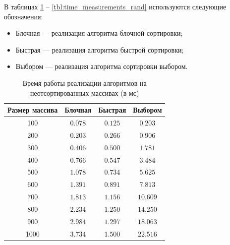 В таблицах \ref{tbl:time_measurements} -- \ref{tbl:time_measurements_rand} используются следующие обозначения: 
\begin{itemize}
	\item Блочная --- реализация алгоритма блочной сортировки;
	\item Быстрая --- реализация алгоритма быстрой сортировки;
	\item Выбором --- реализация алгоритма сортировки выбором.
\end{itemize}

\begin{table}[h]
	\begin{center}
		\begin{threeparttable}
			\captionsetup{justification=raggedright,singlelinecheck=off}
			\caption{Время работы реализации алгоритмов на неотсортированных массивах (в мс)}
			\label{tbl:time_measurements}
			\begin{tabular}{|c|c|c|c|}
				\hline
				Размер массива & Блочная & Быстрая & Выбором \\
				\hline
				100 &$ 0.078 $&$ 0.125 $&$ 0.203 $\\
				\hline
				200 &$ 0.203 $&$ 0.266 $&$ 0.906 $\\
				\hline
				300 &$ 0.406 $&$ 0.500 $&$ 1.781 $\\
				\hline
				400 &$ 0.766 $&$ 0.547 $&$ 3.484 $\\
				\hline
				500 &$ 1.078 $&$ 0.734 $&$ 5.625 $\\
				\hline
				600 &$ 1.391 $&$ 0.891 $&$ 7.813 $\\
				\hline
				700 &$ 1.813 $&$ 1.156 $&$ 10.609 $\\
				\hline
				800 &$ 2.234 $&$ 1.250 $&$ 14.250 $\\
				\hline
				900 &$ 2.984 $&$ 1.297 $&$ 18.063 $\\
				\hline
				1000 &$ 3.734 $&$ 1.500 $&$ 22.516 $\\
				\hline
			\end{tabular}
		\end{threeparttable}
	\end{center}
\end{table}

